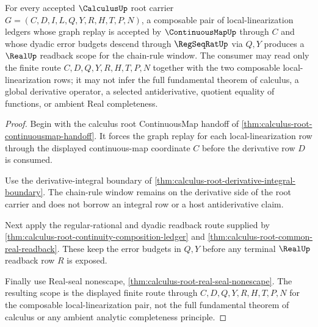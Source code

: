 \begin{theorem}
\label{thm:calculus-root-chain-rule-continuousmap-regseqrat-scope}
For every accepted $\CalculusUp$ root carrier $G=(C,D,I,L,Q,Y,R,H,T,P,N)$, a composable pair of local-linearization ledgers whose graph replay is accepted by $\ContinuousMapUp$ through $C$ and whose dyadic error budgets descend through $\RegSeqRatUp$ via $Q,Y$ produces a $\RealUp$ readback scope for the chain-rule window. The consumer may read only the finite route $C,D,Q,Y,R,H,T,P,N$ together with the two composable local-linearization rows; it may not infer the full fundamental theorem of calculus, a global derivative operator, a selected antiderivative, quotient equality of functions, or ambient Real completeness.
\end{theorem}
\begin{proof}
Begin with the calculus root ContinuousMap handoff of \autoref{thm:calculus-root-continuousmap-handoff}. It forces the graph replay for each local-linearization row through the displayed continuous-map coordinate $C$ before the derivative row $D$ is consumed.

Use the derivative-integral boundary of \autoref{thm:calculus-root-derivative-integral-boundary}. The chain-rule window remains on the derivative side of the root carrier and does not borrow an integral row or a host antiderivative claim.

Next apply the regular-rational and dyadic readback route supplied by \autoref{thm:calculus-root-continuity-composition-ledger} and \autoref{thm:calculus-root-common-real-readback}. These keep the error budgets in $Q,Y$ before any terminal $\RealUp$ readback row $R$ is exposed.

Finally use Real-seal nonescape, \autoref{thm:calculus-root-real-seal-nonescape}. The resulting scope is the displayed finite route through $C,D,Q,Y,R,H,T,P,N$ for the composable local-linearization pair, not the full fundamental theorem of calculus or any ambient analytic completeness principle.
\end{proof}

